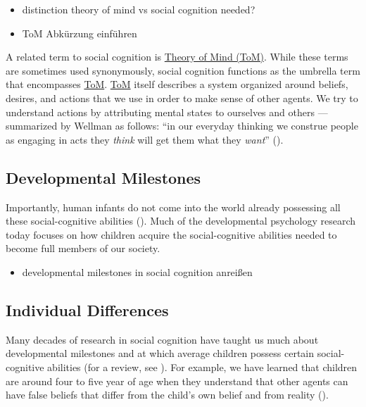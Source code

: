 \documentclass[
]{scrbook}
\providecommand{\tightlist}{%
  \setlength{\itemsep}{0pt}\setlength{\parskip}{0pt}}
\begin{document}
\begin{itemize}
\tightlist
\item
  distinction theory of mind vs social cognition needed?
\item
  ToM Abkürzung einführen
\end{itemize}

A related term to social cognition is \hyperref[acronyms_ToM]{Theory of Mind (ToM)}. While these terms are sometimes used synonymously, social cognition functions as the umbrella term that encompasses \hyperref[acronyms_ToM]{ToM}. \hyperref[acronyms_ToM]{ToM} itself describes a system organized around beliefs, desires, and actions that we use in order to make sense of other agents. We try to understand actions by attributing mental states to ourselves and others --- summarized by Wellman as follows: ``in our everyday thinking we construe people as engaging in acts they \emph{think} will get them what they \emph{want}'' ().

\subsection{Developmental Milestones}\label{developmental-milestones}

Importantly, human infants do not come into the world already possessing all these social-cognitive abilities (). Much of the developmental psychology research today focuses on how children acquire the social-cognitive abilities needed to become full members of our society.

\begin{itemize}
\tightlist
\item
  developmental milestones in social cognition anreißen
\end{itemize}

\subsection{Individual Differences}\label{individual-differences}

Many decades of research in social cognition have taught us much about developmental milestones and at which average children possess certain social-cognitive abilities (for a review, see ). For example, we have learned that children are around four to five year of age when they understand that other agents can have false beliefs that differ from the child's own belief and from reality ().
\end{document}
